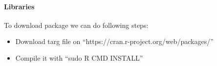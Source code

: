 \paragraph{Libraries}
To download package we can do following steps:
\begin{itemize}
 	\item Download targ file on 
	 ``https://cran.r-project.org/web/packages/''
	 \item Compile it with ``sudo R CMD INSTALL''
 \end{itemize}
